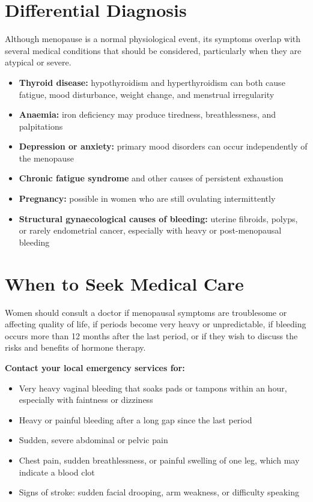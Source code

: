 \section*{Differential Diagnosis}
Although menopause is a normal physiological event, its symptoms overlap with several medical conditions that should be considered, particularly when they are atypical or severe.

\begin{itemize}
    \item \textbf{Thyroid disease:} hypothyroidism and hyperthyroidism can both cause fatigue, mood disturbance, weight change, and menstrual irregularity
    \item \textbf{Anaemia:} iron deficiency may produce tiredness, breathlessness, and palpitations
    \item \textbf{Depression or anxiety:} primary mood disorders can occur independently of the menopause
    \item \textbf{Chronic fatigue syndrome} and other causes of persistent exhaustion
    \item \textbf{Pregnancy:} possible in women who are still ovulating intermittently
    \item \textbf{Structural gynaecological causes of bleeding:} uterine fibroids, polyps, or rarely endometrial cancer, especially with heavy or post-menopausal bleeding
\end{itemize}

\section*{When to Seek Medical Care}
Women should consult a doctor if menopausal symptoms are troublesome or affecting quality of life, if periods become very heavy or unpredictable, if bleeding occurs more than 12 months after the last period, or if they wish to discuss the risks and benefits of hormone therapy.

\textbf{Contact your local emergency services for:}
\begin{itemize}
    \item Very heavy vaginal bleeding that soaks pads or tampons within an hour, especially with faintness or dizziness
    \item Heavy or painful bleeding after a long gap since the last period
    \item Sudden, severe abdominal or pelvic pain
    \item Chest pain, sudden breathlessness, or painful swelling of one leg, which may indicate a blood clot
    \item Signs of stroke: sudden facial drooping, arm weakness, or difficulty speaking
\end{itemize}

